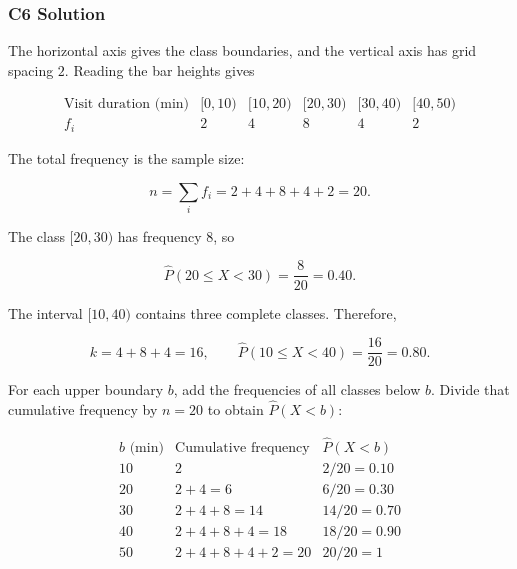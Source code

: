 
\subsubsection*{C6 Solution}
\label{subsec:c6-histogram-solution}

The horizontal axis gives the class boundaries, and the vertical axis has
grid spacing $2$. Reading the bar heights gives

\[
\begin{array}{c|ccccc}
    \text{Visit duration (min)} & [0,10) & [10,20) & [20,30) & [30,40) & [40,50) \\ \hline
    f_i & 2 & 4 & 8 & 4 & 2
\end{array}
\]

The total frequency is the sample size:

\[
n=\sum_i f_i=2+4+8+4+2=20.
\]

The class $[20,30)$ has frequency $8$, so

\[
\widehat P(20\leq X<30)=\frac{8}{20}=0.40.
\]

The interval $[10,40)$ contains three complete classes. Therefore,

\[
k=4+8+4=16,
\qquad
\widehat P(10\leq X<40)=\frac{16}{20}=0.80.
\]

For each upper boundary $b$, add the frequencies of all classes below $b$.
Divide that cumulative frequency by $n=20$ to obtain $\widehat P(X<b)$:

\[
\begin{array}{c|c|c}
    b\text{ (min)} & \text{Cumulative frequency} & \widehat P(X<b) \\ \hline
    10 & 2 & 2/20=0.10 \\
    20 & 2+4=6 & 6/20=0.30 \\
    30 & 2+4+8=14 & 14/20=0.70 \\
    40 & 2+4+8+4=18 & 18/20=0.90 \\
    50 & 2+4+8+4+2=20 & 20/20=1
\end{array}
\]

